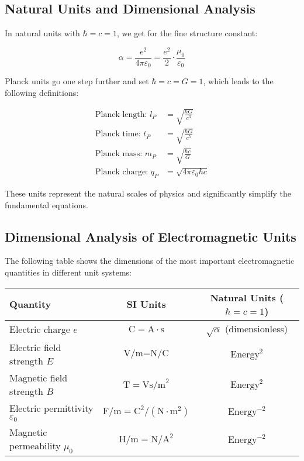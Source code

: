 \documentclass{article}
\begin{document}
\subsection{Natural Units and Dimensional Analysis}

In natural units with $\hbar = c = 1$, we get for the fine structure constant:

\begin{equation}
	\alpha = \frac{e^2}{4\pi\varepsilon_0} = \frac{e^2}{2} \cdot \frac{\mu_0}{\varepsilon_0}
\end{equation}

Planck units go one step further and set $\hbar = c = G = 1$, which leads to the following definitions:

\begin{align}
	\text{Planck length: } l_P &= \sqrt{\frac{\hbar G}{c^3}} \\
	\text{Planck time: } t_P &= \sqrt{\frac{\hbar G}{c^5}} \\
	\text{Planck mass: } m_P &= \sqrt{\frac{\hbar c}{G}} \\
	\text{Planck charge: } q_P &= \sqrt{4\pi\varepsilon_0\hbar c}
\end{align}

These units represent the natural scales of physics and significantly simplify the fundamental equations.

\subsection{Dimensional Analysis of Electromagnetic Units}

The following table shows the dimensions of the most important electromagnetic quantities in different unit systems:

\begin{center}
	\begin{tabular}{|l|c|c|}
		\hline
		\textbf{Quantity} & \textbf{SI Units} & \textbf{Natural Units} ($\hbar = c = 1$) \\
		\hline
		Electric charge $e$ & $\text{C} = \text{A} \cdot \text{s}$ & $\sqrt{\alpha}$ (dimensionless) \\
		Electric field strength $E$ & $\text{V/m} = \text{N/C}$ & $\text{Energy}^2$ \\
		Magnetic field strength $B$ & $\text{T} = \text{Vs/m}^2$ & $\text{Energy}^2$ \\
		Electric permittivity $\varepsilon_0$ & $\text{F/m} = \text{C}^2/(\text{N} \cdot \text{m}^2)$ & $\text{Energy}^{-2}$ \\
		Magnetic permeability $\mu_0$ & $\text{H/m} = \text{N}/\text{A}^2$ & $\text{Energy}^{-2}$ \\
		\hline
	\end{tabular}
\end{center}
\end{document}
